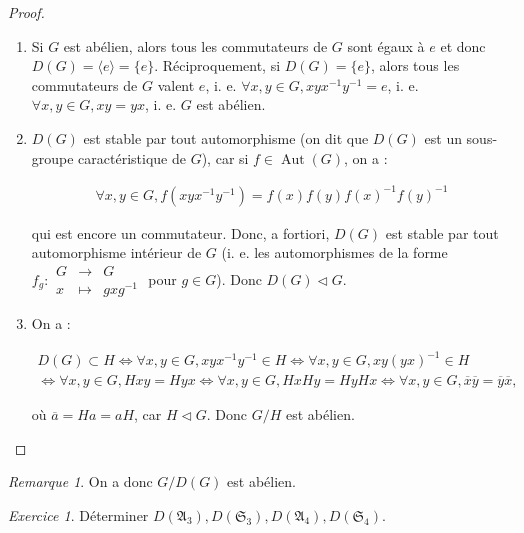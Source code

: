 \documentclass[french]{book}
\theoremstyle{definition}
\theoremstyle{remark}
\newtheorem*{remark}{Remarque}
\newtheorem{exo}{Exercice}
\begin{document}
\begin{proof}

  \

  \begin{enumerate}
    \item Si \(G\) est abélien, alors tous les commutateurs de \(G\) sont égaux à \(e\) et donc \(D(G) = \langle e \rangle = \{ e \} \). Réciproquement, si \(D(G) = \{ e \}\), alors tous les commutateurs de \(G\) valent \(e\), i. e. \(\forall x, y \in G, x y x ^{-1} y ^{-1} = e\), i. e. \(\forall x, y \in G, xy = yx\), i. e. \(G\) est abélien.
    \item \(D(G)\) est stable par tout automorphisme (on dit que \(D(G)\) est un sous-groupe caractéristique de \(G\)), car si \(f \in \operatorname{Aut}(G)\), on a :

    \begin{gather*}
      \forall x, y \in G, f(x y x ^{-1} y ^{-1}) = f(x)f(y)f(x) ^{-1} f(y) ^{-1}
    \end{gather*}

    qui est encore un commutateur. Donc, a fortiori, \(D(G)\) est stable par tout automorphisme intérieur de \(G\) (i. e. les automorphismes de la forme \(f_g :\begin{matrix}
    G & \longrightarrow & G \\
    x & \longmapsto & g x g ^{-1}
    \end{matrix}\) pour \(g \in G\)). Donc \(D(G) \triangleleft G\).

    \item On a :

    \begin{gather*}
      D(G) \subset H \iff \forall x, y \in G, x y x ^{-1} y ^{-1} \in H \iff \forall x, y \in G, x y (y x) ^{-1} \in H \\
      \iff \forall x,y \in G, H x y = H y x \iff \forall x, y \in G, H x H y = H y H x \iff \forall x,y \in G, \overline{x} \overline{y} = \overline{y} \overline{x},
    \end{gather*}

    où \(\overline{a} = Ha = a H \), car \(H \triangleleft G\). Donc \(G/H\) est abélien.
  \end{enumerate}
\end{proof}

\begin{remark}
  On a donc \(G/D(G)\) est abélien.
\end{remark}

\begin{exo}
  Déterminer \(D(\mathfrak{A}_3), D(\mathfrak{S}_{3}), D(\mathfrak{A}_4), D(\mathfrak{S}_{4})\).
\end{exo}
\end{document}
